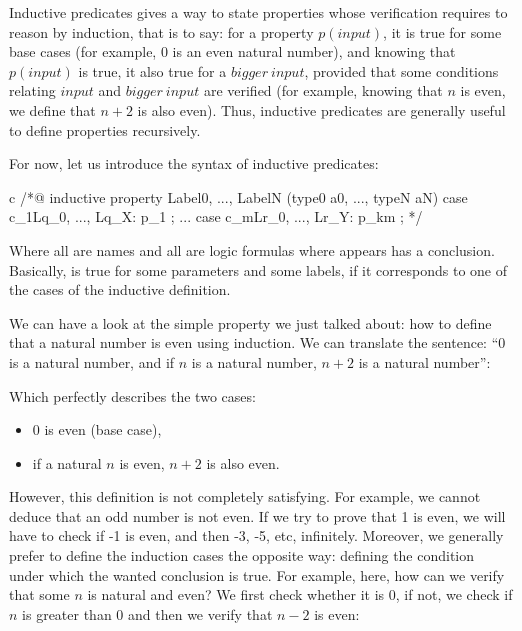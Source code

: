 Inductive predicates gives a way to state properties whose verification requires
to reason by induction, that is to say: for a property $p(input)$, it is true
for some base cases (for example, $0$ is an even natural number), and knowing
that $p(input)$ is true, it also true for a $bigger\ input$, provided that some
conditions relating $input$ and $bigger\ input$ are verified (for example,
knowing that $n$ is even, we define that $n+2$ is also even). Thus, inductive
predicates are generally useful to define properties recursively.


For now, let us introduce the syntax of inductive predicates:

\begin{CodeBlock}{c}
/*@
  inductive property{ Label0, ..., LabelN }(type0 a0, ..., typeN aN) {
  case c_1{Lq_0, ..., Lq_X}: p_1 ;
  ...
  case c_m{Lr_0, ..., Lr_Y}: p_km ;
  }
*/
\end{CodeBlock}

Where all  are names and all  are logic
formulas where  appears has a conclusion. Basically,
 is true for some parameters and some labels, if it
corresponds to one of the cases of the inductive definition.

We can have a look at the simple property we just talked about: how to define
that a natural number is even using induction. We can translate the sentence:
``0 is a natural number, and if $n$ is a natural number, $n+2$ is a natural
number'':






Which perfectly describes the two cases:
\begin{itemize}
\item $0$ is even (base case),
\item if a natural $n$ is even, $n+2$ is also even.
\end{itemize}
  
However, this definition is not completely satisfying. For example, we cannot
deduce that an odd number is not even. If we try to prove that 1 is even, we
will have to check if -1 is even, and then -3, -5, etc, infinitely. Moreover,
we generally prefer to define the induction cases the opposite way: defining
the condition under which the wanted conclusion is true. For example, here,
how can we verify that some $n$ is natural and even? We first check whether it
is 0, if not, we check if $n$ is greater than $0$ and then we verify that $n-2$
is even:



